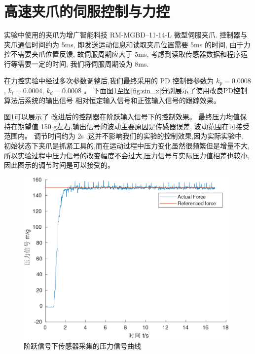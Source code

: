 \section{高速夹爪的伺服控制与力控}
实验中使用的夹爪为增广智能科技 RM-MGBD--11-14-L 微型伺服夹爪.
控制器与夹爪通信时间约为 5ms, 即发送运动信息和读取夹爪位置需要 5ms 的时间,
由于力控不需要夹爪位置反馈, 故伺服周期应大于 5ms,
考虑到读取传感器数据和程序运行等需要一定的时间, 我们将伺服周期设为 8ms.

在力控实验中经过多次参数调整后,我们最终采用的 PD 控制器参数为
$k_p = 0.0008$ , $k_i = 0.0004$, $k_d = 0.0008$ 。
下面图\ref{fig:150}至图\ref{fig:sin_x}分别展示了使用改良PD控制算法后系统的输出信号
相对恒定输入信号和正弦输入信号的跟踪效果。





图\ref{fig:150}可以展示了 改进后的控制器在阶跃输入信号下的控制效果。
最终压力均值保持在期望值 150 g左右,输出信号的波动主要原因是传感器误差,
波动范围在可接受范围内。
调节时间约为 2s ,这并不影响我们的实验的控制效果,因为实际实验中,
初始状态下夹爪是抓紧工具的,而在运动过程中压力变化虽然很频繁但是增量不大,
所以实验过程中压力信号的改变幅度不会过大,压力信号与实际压力值相差也较小,
因此图示的调节时间是可以接受的。

\begin{figure}[!ht]
  \centering
  \includegraphics[width=11cm]{chapter04/pic/150}
  \caption{\label{fig:150}
    阶跃信号下传感器采集的压力信号曲线}
  \vspace{-0.3cm}
\end{figure}


